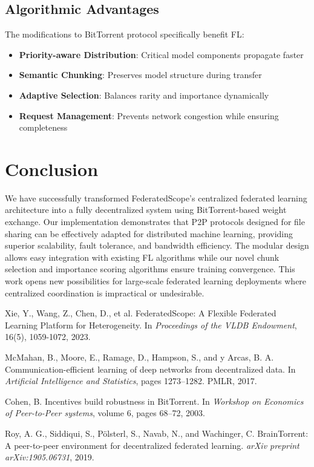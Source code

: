 \documentclass[11pt,conference]{article}
\begin{document}
\subsection{Algorithmic Advantages}

The modifications to BitTorrent protocol specifically benefit FL:

\begin{itemize}
    \item \textbf{Priority-aware Distribution}: Critical model components propagate faster
    \item \textbf{Semantic Chunking}: Preserves model structure during transfer
    \item \textbf{Adaptive Selection}: Balances rarity and importance dynamically
    \item \textbf{Request Management}: Prevents network congestion while ensuring completeness
\end{itemize}

\section{Conclusion}

We have successfully transformed FederatedScope's centralized federated learning architecture into a fully decentralized system using BitTorrent-based weight exchange. Our implementation demonstrates that P2P protocols designed for file sharing can be effectively adapted for distributed machine learning, providing superior scalability, fault tolerance, and bandwidth efficiency. The modular design allows easy integration with existing FL algorithms while our novel chunk selection and importance scoring algorithms ensure training convergence. This work opens new possibilities for large-scale federated learning deployments where centralized coordination is impractical or undesirable.


\begin{thebibliography}{99}

Xie, Y., Wang, Z., Chen, D., et al.
\newblock FederatedScope: A Flexible Federated Learning Platform for Heterogeneity.
\newblock In \emph{Proceedings of the VLDB Endowment}, 16(5), 1059-1072, 2023.

McMahan, B., Moore, E., Ramage, D., Hampson, S., and y Arcas, B. A.
\newblock Communication-efficient learning of deep networks from decentralized data.
\newblock In \emph{Artificial Intelligence and Statistics}, pages 1273–1282. PMLR, 2017.

Cohen, B.
\newblock Incentives build robustness in BitTorrent.
\newblock In \emph{Workshop on Economics of Peer-to-Peer systems}, volume 6, pages 68–72, 2003.

Roy, A. G., Siddiqui, S., Pölsterl, S., Navab, N., and Wachinger, C.
\newblock BrainTorrent: A peer-to-peer environment for decentralized federated learning.
\newblock \emph{arXiv preprint arXiv:1905.06731}, 2019.

\end{thebibliography}
\end{document}
